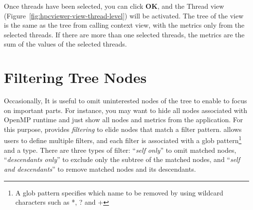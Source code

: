 Once threads have been selected, you can click \textbf{OK}, and the Thread view (Figure~\ref{fig:hpcviewer-view-thread-level}) will be activated. 
The tree of the view is the same as the tree from calling context view, with the metrics only from the selected threads.
If there are more than one selected threads, the metrics are the sum of the values of the selected threads.


\section{Filtering Tree Nodes}
\label{sec:filter}
Occasionally, It is useful to omit uninterested nodes of the tree to enable to focus on important parts. 
For instance, you may want to hide all nodes associated with OpenMP runtime and just show all nodes and metrics from the application. 
For this purpose, \hpcviewer{} provides \emph{filtering} to elide nodes that match a filter pattern.
\hpcviewer{} allows  users to define multiple filters, and each filter is associated with a glob pattern\footnote{A glob pattern specifies which name to be removed by using wildcard characters such as *, ? and +} and a type.
There are three types of filter: ``\emph{self only}'' to omit matched nodes, 
``\emph{descendants only}'' to exclude only the subtree of the matched nodes, and ``\emph{self and descendants}'' to
remove matched nodes and its descendants.

